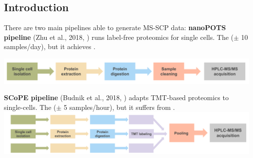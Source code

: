 \documentclass{article}
\begin{document}
\setlength{\columnsep}{0.5cm}
\begin{multicols}{2}

\noindent
\begin{minipage}[t]{\linewidth}
  \vspace{0.5cm}
  \section*{\huge Introduction}
  \large
  There are two main pipelines able to generate MS-SCP data:
  \textbf{\large nanoPOTS pipeline} (Zhu et al., 2018, \cite{Zhu2018-bf}) runs label-free proteomics for single cells. The \textbf{\color{BrickRed}{throughput is low}} ($\pm$ 10 samples/day), but it achieves \textbf{\color{OliveGreen}{accurate peptide quantification}}. 
    \vspace{-0.3cm}
    \begin{center}
      \includegraphics[width=0.87\linewidth]{figs/nanopots.png} \\
    \end{center}
    \vspace{-0.3cm}
  \textbf{\large SCoPE pipeline} (Budnik et al., 2018, \cite{Budnik2018-qh}) adapts TMT-based proteomics to single-cells. The \textbf{\color{OliveGreen}{throughput is higher}} ($\pm$ 5 samples/hour), but it suffers from \textbf{\color{BrickRed}{presence of chemical noise}}.
    \includegraphics[width=0.9\linewidth]{figs/scopems.png} \\
    \vspace{-0.3cm}
\end{minipage}


\noindent
\begin{minipage}[t]{\linewidth}
  \vspace{0.55cm}

\end{minipage}
\end{multicols}
\end{document}
